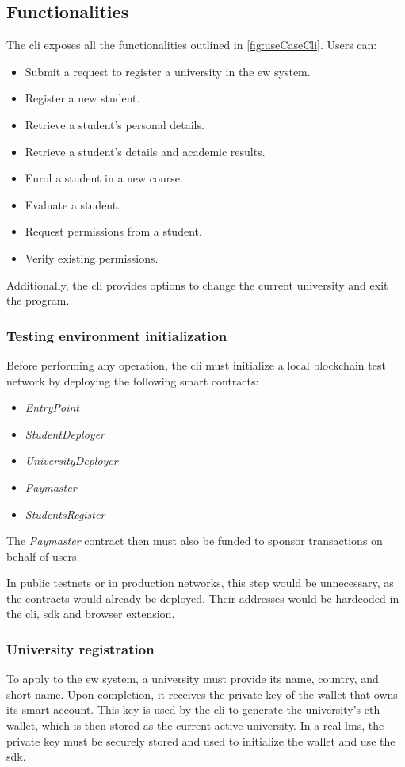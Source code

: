 \subsection{Functionalities}
The \acrshort{cli} exposes all the functionalities outlined in \cref{fig:useCaseCli}. Users can:
\begin{itemize}
    \item Submit a request to register a university in the \acrshort{ew} system.
    \item Register a new student.
    \item Retrieve a student’s personal details.
    \item Retrieve a student’s details and academic results.
    \item Enrol a student in a new course.
    \item Evaluate a student.
    \item Request permissions from a student.
    \item Verify existing permissions.
\end{itemize}
Additionally, the \acrshort{cli} provides options to change the current university and exit the program.

\subsubsection{Testing environment initialization}
Before performing any operation, the \acrshort{cli} must initialize a local blockchain test network by deploying the following smart contracts:
\begin{itemize}
    \item \textit{EntryPoint}
    \item \textit{StudentDeployer}
    \item \textit{UniversityDeployer}
    \item \textit{Paymaster}
    \item \textit{StudentsRegister}
\end{itemize}
The \textit{Paymaster} contract then must also be funded to sponsor transactions on behalf of users.

In public testnets or in production networks, this step would be unnecessary, as the contracts would already be deployed. Their addresses would be hardcoded in the \acrshort{cli}, \acrshort{sdk} and browser extension.

\subsubsection{University registration}
\label{sssec:applyEw}
To apply to the \acrshort{ew} system, a university must provide its name, country, and short name. Upon completion, it receives the private key of the wallet that owns its smart account. This key is used by the \acrshort{cli} to generate the university's \acrlong{eth} wallet, which is then stored as the current active university. In a real \acrshort{lms}, the private key must be securely stored and used to initialize the wallet and use the \acrshort{sdk}. 

